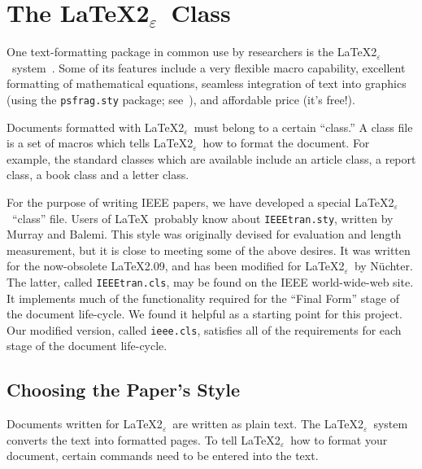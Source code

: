 \documentclass[%
	final,
	notitlepage,
	narroweqnarray,
	inline,
	twoside,
	]{ieee}
\newcommand{\latexiie}{\LaTeX2{\Large$_\varepsilon$}}
\begin{document}
\section{The \latexiie\ Class}
\label{sec:latex}

One text-formatting package in common use by researchers is the
\latexiie\ system~\cite{lamport}. Some of its features include a very
flexible macro capability, excellent formatting of mathematical
equations, seamless integration of text into graphics (using the
\texttt{psfrag.sty} package; see~\cite{goossens}), and affordable
price (it's free!).

Documents formatted with \latexiie\ must belong to a certain ``class.''
A class file is a set of macros which tells \latexiie\ how to format
the document. For example, the standard classes which are available
include an article class, a report class, a book class and a letter
class.

For the purpose of writing IEEE papers, we have developed a special
\latexiie\ ``class'' file. Users of \LaTeX\ probably know about
\texttt{IEEEtran.sty}, written by Murray and Balemi. This style was 
originally devised for evaluation and length measurement, but it is
close to meeting some of the above desires. It was written for the
now-obsolete \LaTeX 2.09, and has been modified for \latexiie\ by
N\"{u}chter. The latter, called \texttt{IEEEtran.cls}, may be found on
the IEEE world-wide-web site.  It implements much of the functionality
required for the ``Final Form'' stage of the document life-cycle. We
found it helpful as a starting point for this project. Our modified
version, called \texttt{ieee.cls}, satisfies all of the requirements
for each stage of the document life-cycle.

\subsection{Choosing the Paper's Style}

Documents written for \latexiie\ are written as plain text. The
\latexiie\ system converts the text into formatted pages. To tell
\latexiie\ how to format your document, certain commands need to be
entered into the text.
\end{document}
